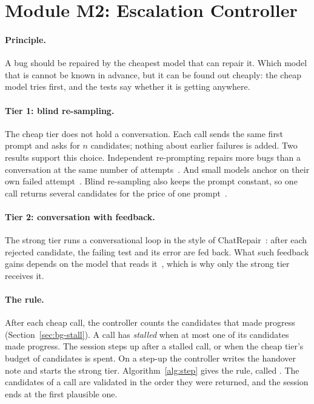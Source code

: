 \section{Module M2: Escalation Controller}
\label{sec:sys-controller}

\paragraph{Principle.} A bug should be repaired by the cheapest model that can
repair it. Which model that is cannot be known in advance, but it can be found
out cheaply: the cheap model tries first, and the tests say whether it is
getting anywhere.

\paragraph{Tier 1: blind re-sampling.} The cheap tier does not hold a
conversation. Each call sends the same first prompt and asks for $n$
candidates; nothing about earlier failures is added. Two results support this
choice. Independent re-prompting repairs more bugs than a conversation at the
same number of attempts~\citep{chen2025conversational}. And small models
anchor on their own failed attempt~\citep{verma2026blind}. Blind re-sampling
also keeps the prompt constant, so one call returns several candidates for the
price of one prompt~\citep{hidvegi2024cigar}.

\paragraph{Tier 2: conversation with feedback.} The strong tier runs a
conversational loop in the style of
ChatRepair~\citep{xia2024chatrepair}: after each rejected candidate,
the failing test and its error are fed back. What such feedback gains depends
on the model that reads it~\citep{olausson2024selfrepair}, which is why only
the strong tier receives it.

\paragraph{The rule.} After each cheap call, the controller counts the
candidates that made progress (Section~\ref{sec:bg-stall}). A call has
\emph{stalled} when at most one of its candidates made progress. The session
steps up after a stalled call, or when the cheap tier's budget of candidates
is spent. On a step-up the controller writes the handover note and starts the
strong tier. Algorithm~\ref{alg:step} gives the rule, called \Step. The
candidates of a call are validated in the order they were returned, and the
session ends at the first plausible one.

